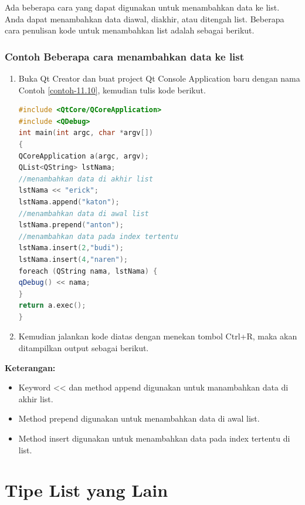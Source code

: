 Ada beberapa cara yang dapat digunakan untuk menambahkan data ke list.
Anda dapat menambahkan data diawal, diakhir, atau ditengah list.
Beberapa cara penulisan kode untuk menambahkan list adalah sebagai
berikut.

\subsubsection*{Contoh Beberapa cara menambahkan data ke list}

\begin{enumerate}

\item
  Buka Qt Creator dan buat project Qt Console Application baru dengan
  nama Contoh \ref{contoh-11.10}, kemudian tulis kode berikut.

\begin{lstlisting}[language=c++, caption= Beberapa cara menambahkan data ke list, label=contoh-11.10]
#include <QtCore/QCoreApplication>
#include <QDebug>
int main(int argc, char *argv[])
{
QCoreApplication a(argc, argv);
QList<QString> lstNama;
//menambahkan data di akhir list
lstNama << "erick";
lstNama.append("katon");
//menambahkan data di awal list
lstNama.prepend("anton");
//menambahkan data pada index tertentu
lstNama.insert(2,"budi");
lstNama.insert(4,"naren");
foreach (QString nama, lstNama) {
qDebug() << nama;
}
return a.exec();
}
\end{lstlisting}
\item
  Kemudian jalankan kode diatas dengan menekan tombol Ctrl+R, maka akan
  ditampilkan output sebagai berikut.
\end{enumerate}

\textbf{Keterangan:}

\begin{itemize}

\item
  Keyword \textless{}\textless{} dan method append digunakan untuk
  manambahkan data di akhir list.
\item
  Method prepend digunakan untuk menambahkan data di awal list.
\item
  Method insert digunakan untuk menambahkan data pada index tertentu di
  list.
\end{itemize}

\section{Tipe List yang Lain}\label{tipe-list-yang-lain}

